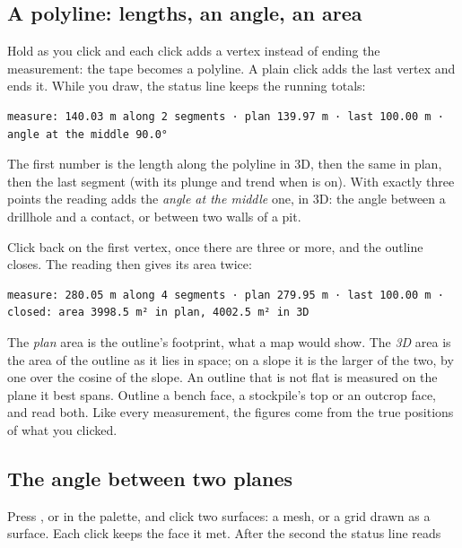\subsection{A polyline: lengths, an angle, an area}\label{sec:picking-polyline}
Hold  as you click and each click adds a vertex instead of ending the measurement: the tape becomes a polyline. A plain click adds the last vertex and ends it. While you draw, the status line keeps the running totals:

\begin{lstlisting}
measure: 140.03 m along 2 segments · plan 139.97 m · last 100.00 m · angle at the middle 90.0°
\end{lstlisting}

The first number is the length along the polyline in 3D, then the same in plan, then the last segment (with its plunge and trend when  is on). With exactly three points the reading adds the \emph{angle at the middle} one, in 3D: the angle between a drillhole and a contact, or between two walls of a pit.

Click back on the first vertex, once there are three or more, and the outline closes. The reading then gives its area twice:

\begin{lstlisting}
measure: 280.05 m along 4 segments · plan 279.95 m · last 100.00 m · closed: area 3998.5 m² in plan, 4002.5 m² in 3D
\end{lstlisting}

The \emph{plan} area is the outline's footprint, what a map would show. The \emph{3D} area is the area of the outline as it lies in space; on a slope it is the larger of the two, by one over the cosine of the slope. An outline that is not flat is measured on the plane it best spans. Outline a bench face, a stockpile's top or an outcrop face, and read both. Like every measurement, the figures come from the true positions of what you clicked.

\subsection{The angle between two planes}\label{sec:picking-planes}
Press , or  in the palette, and click two surfaces: a mesh, or a grid drawn as a surface. Each click keeps the face it met. After the second the status line reads

